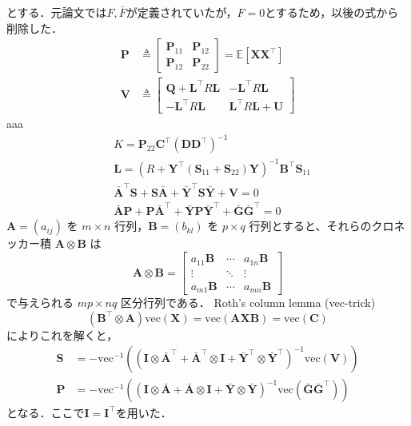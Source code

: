 とする．元論文では$F, \bar{F}$が定義されていたが，$F=0$とするため，以後の式から削除した．
\begin{align}
\mathbf{P} &\triangleq\begin{bmatrix}
\mathbf{P}_{11} & \mathbf{P}_{12} \\
\mathbf{P}_{12} & \mathbf{P}_{22}
\end{bmatrix} = \mathbb{E}\left[\mathbf{X} \mathbf{X}^\top\right] \\
\mathbf{V} &\triangleq\begin{bmatrix}
\mathbf{Q}+\mathbf{L}^\top R \mathbf{L} & -\mathbf{L}^\top R \mathbf{L} \\
-\mathbf{L}^\top R \mathbf{L} & \mathbf{L}^\top R \mathbf{L}+\mathbf{U}
\end{bmatrix}
\end{align}
aaa
\begin{align}
&K=\mathbf{P}_{22} \mathbf{C}^\top\left(\mathbf{D} \mathbf{D}^\top\right)^{-1} \\
&\mathbf{L}=\left(R+\mathbf{Y}^\top\left(\mathbf{S}_{11}+\mathbf{S}_{22}\right) \mathbf{Y}\right)^{-1} \mathbf{B}^\top \mathbf{S}_{11} \\
&\bar{\mathbf{A}}^\top \mathbf{S}+\mathbf{S} \bar{\mathbf{A}}+\bar{\mathbf{Y}}^\top \mathbf{S} \bar{\mathbf{Y}}+\mathbf{V}=0 \\
&\bar{\mathbf{A}} \mathbf{P}+\mathbf{P} \bar{\mathbf{A}}^\top+\bar{\mathbf{Y}} \mathbf{P} \bar{\mathbf{Y}}^\top+\bar{\mathbf{G}} \bar{\mathbf{G}}^\top=0
\end{align}
$\mathbf{A} = (a_{ij})$ を $m \times n$ 行列，$\mathbf{B} = (b_{kl})$ を $p \times q$ 行列とすると、それらのクロネッカー積 $\mathbf{A} \otimes \mathbf{B}$ は
\begin{equation}
\mathbf{A}\otimes \mathbf{B}={\begin{bmatrix}a_{11}\mathbf{B}&\cdots &a_{1n}\mathbf{B}\\\vdots &\ddots &\vdots \\a_{m1}\mathbf{B}&\cdots &a_{mn}\mathbf{B}\end{bmatrix}}
\end{equation}
で与えられる $mp \times nq$ 区分行列である．
Roth's column lemma (vec-trick) 
\begin{equation}
(\mathbf{B}^\top \otimes \mathbf{A})\text{vec}(\mathbf{X}) = \text{vec}(\mathbf{A}\mathbf{X}\mathbf{B})=\text{vec}(\mathbf{C})
\end{equation}
によりこれを解くと，
\begin{align}
\mathbf{S} &= -\text{vec}^{-1}\left(\left(\mathbf{I} \otimes \bar{\mathbf{A}}^\top + \bar{\mathbf{A}}^\top \otimes \mathbf{I} + \bar{\mathbf{Y}}^\top \otimes \bar{\mathbf{Y}}^\top\right)^{-1}\text{vec}(\mathbf{V})\right)\\
\mathbf{P} &= -\text{vec}^{-1}\left(\left(\mathbf{I} \otimes \bar{\mathbf{A}} + \bar{\mathbf{A}} \otimes \mathbf{I} + \bar{\mathbf{Y}} \otimes \bar{\mathbf{Y}}\right)^{-1}\text{vec}(\bar{\mathbf{G}}\bar{\mathbf{G}}^\top)\right)
\end{align}
となる．ここで$\mathbf{I}=\mathbf{I}^\top$を用いた．
